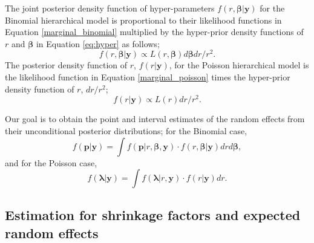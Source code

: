 \documentclass[article]{jss}
\begin{document}

The joint posterior density  function of hyper-parameters $f(r, \boldsymbol{\boldsymbol{\beta}}\vert \boldsymbol{y})$ for the Binomial hierarchical model is proportional to their likelihood functions in Equation \ref{marginal_binomial} multiplied by the hyper-prior density functions of $r$ and $\boldsymbol{\beta}$ in Equation \ref{eq:hyper} as follows;
\begin{equation}\label{marginal_post}
f(r, \boldsymbol{\boldsymbol{\beta}}\vert \boldsymbol{y})\propto L(r, \boldsymbol{\boldsymbol{\beta}})d\boldsymbol{\beta}dr/r^2.
\end{equation}
The posterior density function of $r$, $f(r\vert \boldsymbol{y})$, for the Poisson hierarchical model is  the likelihood function in Equation \ref{marginal_poisson} times the hyper-prior density function of $r$, $dr/r^2$;
\begin{equation}\label{marginal_post}
f(r \vert \boldsymbol{y})\propto L(r)dr/r^2.
\end{equation}

Our goal is to obtain the point and interval estimates of the random effects from their unconditional posterior distributions; for the Binomial case, 
\begin{equation}\label{mcintegration}
f(\boldsymbol{p}\vert \boldsymbol{y})=\int  f(\boldsymbol{p}\vert r, \boldsymbol{\beta}, \boldsymbol{y})\cdot f(r, \boldsymbol{\beta}\vert \boldsymbol{y})dr d\boldsymbol{\beta},
\end{equation}
and for the Poisson case, 
\begin{equation}\label{mcintegration}
f(\boldsymbol{\lambda}\vert \boldsymbol{y})=\int  f(\boldsymbol{\lambda}\vert r, \boldsymbol{y})\cdot f(r\vert \boldsymbol{y})dr.
\end{equation}

\subsection[shrinkage]{Estimation for shrinkage factors and expected random effects}\label{shrinkage}
\end{document}
